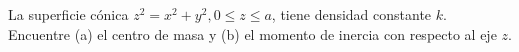 \item La superficie cónica $z^2 = x^2 + y^2, 0 \le z \le a$, tiene densidad constante $k$. Encuentre (a) el centro de masa y (b) el momento de inercia con respecto al eje $z$.
